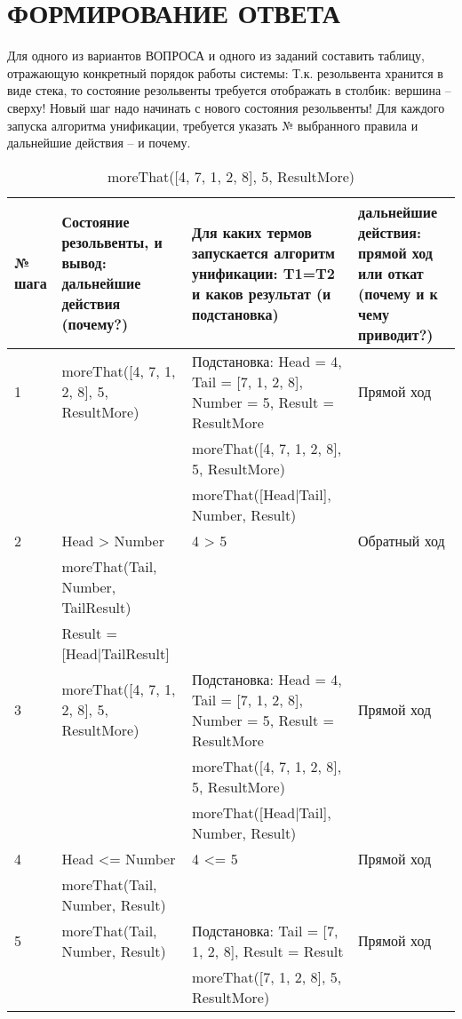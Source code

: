 \section{ФОРМИРОВАНИЕ ОТВЕТА}

Для одного из вариантов ВОПРОСА и одного из заданий  составить таблицу, отражающую конкретный порядок работы системы: Т.к. резольвента хранится в виде стека, то состояние резольвенты требуется отображать в столбик: вершина – сверху! Новый шаг надо начинать с нового состояния резольвенты! Для каждого запуска алгоритма унификации, требуется указать № выбранного правила и дальнейшие действия – и почему.

{
\small
\begin{longtable}{|p{1.15cm}|p{6cm}|p{6cm}|p{4cm}|}
    \caption{moreThat([4, 7, 1, 2, 8], 5, ResultMore)} \\
    \hline
    № шага & Состояние резольвенты, и вывод: дальнейшие действия (почему?) & Для каких термов запускается алгоритм унификации: T1=T2 и каков результат (и подстановка) & дальнейшие действия: прямой ход или откат (почему и к чему приводит?) \\
    \hline
    1 & moreThat([4, 7, 1, 2, 8], 5, ResultMore) & Подстановка: Head = 4, Tail = [7, 1, 2, 8], Number = 5, Result = ResultMore & Прямой ход \\
      & & moreThat([4, 7, 1, 2, 8], 5, ResultMore) & \\
      & & moreThat([Head|Tail], Number, Result) & \\
    \hline
    2 & Head > Number & 4 > 5 & Обратный ход \\
      & moreThat(Tail, Number, TailResult) & & \\
      & Result = [Head|TailResult] & & \\
    \hline
    3 & moreThat([4, 7, 1, 2, 8], 5, ResultMore) & Подстановка: Head = 4, Tail = [7, 1, 2, 8], Number = 5, Result = ResultMore & Прямой ход \\
      & & moreThat([4, 7, 1, 2, 8], 5, ResultMore) & \\
      & & moreThat([Head|Tail], Number, Result) & \\
    \hline
    4 & Head <= Number & 4 <= 5 & Прямой ход \\
      & moreThat(Tail, Number, Result) & & \\
    \hline
    5 & moreThat(Tail, Number, Result) & Подстановка: Tail = [7, 1, 2, 8], Result = Result & Прямой ход \\
      & & moreThat([7, 1, 2, 8], 5, ResultMore) & \\

\end{longtable}}
